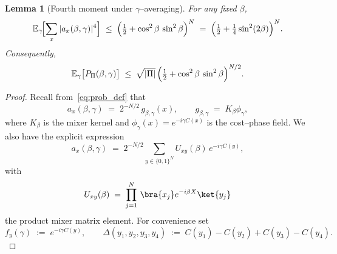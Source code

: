 \documentclass[a4paper,onecolumn,11pt,unpublished]{quantumarticle}
\newtheorem{lemma}[theorem]{Lemma}
\theoremstyle{remark}
\begin{document}
\begin{lemma}[Fourth moment under $\gamma$--averaging]
\label{lem:L4-avg-gamma-correct}
For any fixed $\beta$,
\[
  \mathbb{E}_{\gamma}\!\Bigl[\sum_{x}|a_x(\beta,\gamma)|^4\Bigr]
  \;\le\;
  \Bigl(\tfrac12+\cos^2\beta\,\sin^2\beta\Bigr)^{N}
  \;=\;\Bigl(\tfrac12+\tfrac14\sin^2(2\beta)\Bigr)^{N}.
\]
Consequently,
\[
  \mathbb{E}_{\gamma}\bigl[P_{\Pi}(\beta,\gamma)\bigr]
  \;\le\;
  \sqrt{|\Pi|}\,\Bigl(\tfrac12+\cos^2\beta\,\sin^2\beta\Bigr)^{N/2}.
\]
\end{lemma}

\begin{proof}
Recall from~\eqref{eq:prob_def} that
\[
  a_x(\beta,\gamma)
  \;=\;
  2^{-N/2}\,g_{\beta,\gamma}(x),
  \qquad
  g_{\beta,\gamma}
  \;=\;
  K_\beta\phi_\gamma,
\]
where $K_\beta$ is the mixer kernel and $\phi_\gamma(x)=e^{-i\gamma C(x)}$ is the cost–phase field.  We also have the explicit expression
\[
  a_x(\beta,\gamma)
  \;=\;
  2^{-N/2} \sum_{y\in\{0,1\}^N}
  U_{xy}(\beta)\,e^{-i\gamma C(y)},
\]
with
\[
  U_{xy}(\beta)
  \;=\;
  \prod_{j=1}^{N}
  \,\bra{x_j}e^{-i\beta X}\ket{y_j}
\]
the product mixer matrix element.  For convenience set
\[
  f_y(\gamma)\;:=\;e^{-i\gamma C(y)},
  \qquad
  \Delta(y_1,y_2,y_3,y_4)
  \;:=\;
  C(y_1)-C(y_2)+C(y_3)-C(y_4).
\]


\end{proof}
\end{document}
